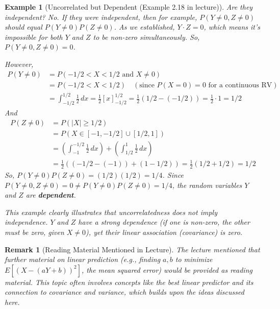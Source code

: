 \documentclass[11pt]{article}
\newtheorem{example}[theorem]{Example}
\newtheorem{remark}[theorem]{Remark}
\begin{document}
\begin{example}[Uncorrelated but Dependent (Example 2.18 in lecture)]
Are they independent? No.
If they were independent, then for example, $P(Y \neq 0, Z \neq 0)$ should equal $P(Y \neq 0)P(Z \neq 0)$.
As we established, $Y \cdot Z = 0$, which means it's impossible for both $Y$ and $Z$ to be non-zero simultaneously.
So, $P(Y \neq 0, Z \neq 0) = 0$.

However,
\begin{align*}
P(Y \neq 0) &= P(-1/2 < X < 1/2 \text{ and } X \neq 0) \\
             &= P(-1/2 < X < 1/2) \quad (\text{since } P(X=0)=0 \text{ for a continuous RV}) \\
             &= \int_{-1/2}^{1/2} \frac{1}{2} \, dx = \frac{1}{2} [x]_{-1/2}^{1/2} = \frac{1}{2} (1/2 - (-1/2)) = \frac{1}{2} \cdot 1 = 1/2
\end{align*}
And
\begin{align*}
P(Z \neq 0) &= P(|X| \ge 1/2) \\
             &= P(X \in [-1, -1/2] \cup [1/2, 1]) \\
             &= \left( \int_{-1}^{-1/2} \frac{1}{2} \, dx \right) + \left( \int_{1/2}^{1} \frac{1}{2} \, dx \right) \\
             &= \frac{1}{2} \left( (-1/2 - (-1)) + (1 - 1/2) \right) = \frac{1}{2} (1/2 + 1/2) = 1/2
\end{align*}
So, $P(Y \neq 0)P(Z \neq 0) = (1/2)(1/2) = 1/4$.
Since $P(Y \neq 0, Z \neq 0) = 0 \neq P(Y \neq 0)P(Z \neq 0) = 1/4$, the random variables $Y$ and $Z$ are \textbf{dependent}.

This example clearly illustrates that uncorrelatedness does not imply independence. $Y$ and $Z$ have a strong dependence (if one is non-zero, the other must be zero, given $X \ne 0$), yet their linear association (covariance) is zero.
\end{example}

\begin{remark}[Reading Material Mentioned in Lecture]
The lecture mentioned that further material on linear prediction (e.g., finding $a,b$ to minimize $E[(X - (aY+b))^2]$, the mean squared error) would be provided as reading material. This topic often involves concepts like the best linear predictor and its connection to covariance and variance, which builds upon the ideas discussed here.
\end{remark}
\end{document}
